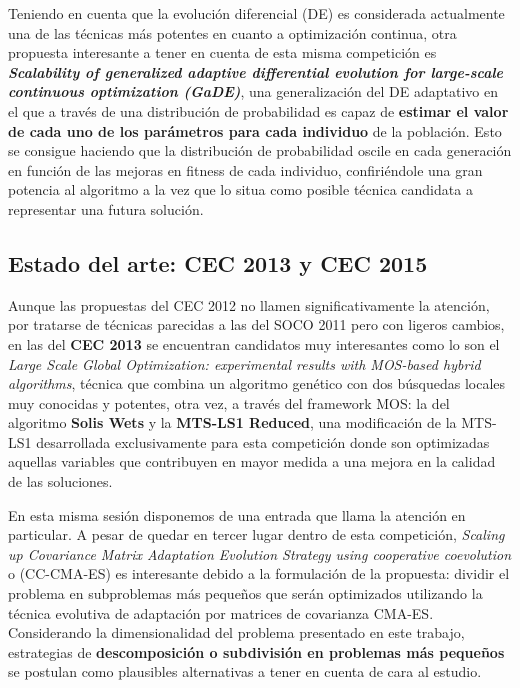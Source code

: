 Teniendo en cuenta que la evolución diferencial (DE)\cite{DE} es considerada actualmente una de las técnicas más potentes en cuanto a optimización continua, otra propuesta interesante a tener en cuenta de esta misma competición es \textbf{\textit{Scalability of generalized adaptive differential evolution for large-scale continuous optimization (GaDE)}}\cite{GaDE}, una generalización del DE adaptativo en el que a través de una distribución de probabilidad es capaz de \textbf{estimar el valor de cada uno de los parámetros para cada individuo} de la población. Esto se consigue haciendo que la distribución de probabilidad oscile en cada generación en función de las mejoras en fitness de cada individuo, confiriéndole una gran potencia al algoritmo a la vez que lo situa como posible técnica candidata a representar una futura solución.

\subsection{Estado del arte: CEC 2013 y CEC 2015}

Aunque las propuestas del CEC 2012 no llamen significativamente la atención, por tratarse de técnicas parecidas a las del SOCO 2011 pero con ligeros cambios, en las del \textbf{CEC 2013} se encuentran candidatos muy interesantes como lo son el \textit{Large Scale Global Optimization: experimental results with MOS-based hybrid algorithms}\cite{MOS2013}, técnica que combina un algoritmo genético con dos búsquedas locales muy conocidas y potentes, otra vez, a través del framework MOS: la del algoritmo \textbf{Solis Wets}\cite{SolisWets} y la \textbf{MTS-LS1 Reduced}, una modificación de la MTS-LS1\cite{MTS-LSGO} desarrollada exclusivamente para esta competición donde son optimizadas aquellas variables que contribuyen en mayor medida a una mejora en la calidad de las soluciones.

En esta misma sesión disponemos de una entrada que llama la atención en particular. A pesar de quedar en tercer lugar dentro de esta competición, \textit{Scaling up Covariance Matrix Adaptation Evolution Strategy using cooperative coevolution}\cite{CC-CMAES} o (CC-CMA-ES) es interesante debido a la formulación de la propuesta: dividir el problema en subproblemas más pequeños que serán optimizados utilizando la técnica evolutiva de adaptación por matrices de covarianza CMA-ES. Considerando la dimensionalidad del problema presentado en este trabajo, estrategias de \textbf{descomposición o subdivisión en problemas más pequeños} se postulan como plausibles alternativas a tener en cuenta de cara al estudio.

